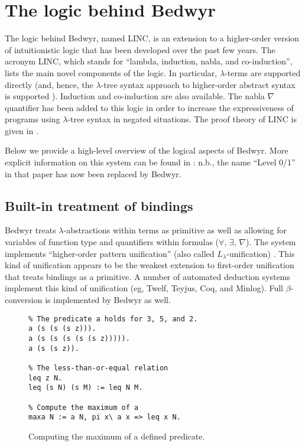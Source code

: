 \documentclass{article}
\newcommand{\Ll}{$L_\lambda$}
\begin{document}
\section{The logic behind Bedwyr}
\label{logic}

The logic behind Bedwyr, named LINC, is an extension to a higher-order
version of intuitionistic logic that has been developed over the past
few years.  The acronym LINC, which stands for ``lambda, induction,
nabla, and co-induction'', lists the main novel components of the
logic.  In particular, $\lambda$-terms are supported directly (and,
hence, the $\lambda$-tree syntax approach to higher-order abstract
syntax is supported \cite{miller00cl}).  Induction and co-induction
are also available.  The nabla $\nabla$ quantifier has been added to
this logic in order to increase the expressiveness of programs using
$\lambda$-tree syntax in negated situations.  The proof theory of LINC
is given in \cite{miller05tocl,tiu04phd}.

Below we provide a high-level overview of the logical aspects of Bedwyr.
More explicit information on this system can be found in
\cite{tiu05eshol}: n.b., the name ``Level 0/1'' in that paper has now
been replaced by Bedwyr.

\subsection{Built-in treatment of bindings}

Bedwyr treats $\lambda$-abstractions within terms as primitive as well
as allowing for variables of function type and quantifiers within
formulas ($\forall$, $\exists$, $\nabla$).  The system
implements ``higher-order pattern unification'' (also called
\Ll-unification) \cite{miller91jlc}.   This kind of unification
appears to be the weakest extension to first-order unification that
treats bindings as a primitive.  A number of automated deduction systems
implement this kind of unification (eg, Twelf, Teyjus, Coq, and
Minlog).  Full $\beta$-conversion is implemented by Bedwyr as well.

\begin{figure}
\begin{verbatim}
% The predicate a holds for 3, 5, and 2.
a (s (s (s z))).
a (s (s (s (s (s z))))).
a (s (s z)).

% The less-than-or-equal relation
leq z N.
leq (s N) (s M) := leq N M.

% Compute the maximum of a
maxa N := a N, pi x\ a x => leq x N.
\end{verbatim}
\caption{Computing the maximum of a defined predicate.}
\label{maxa-lp}
\end{figure}
\end{document}
